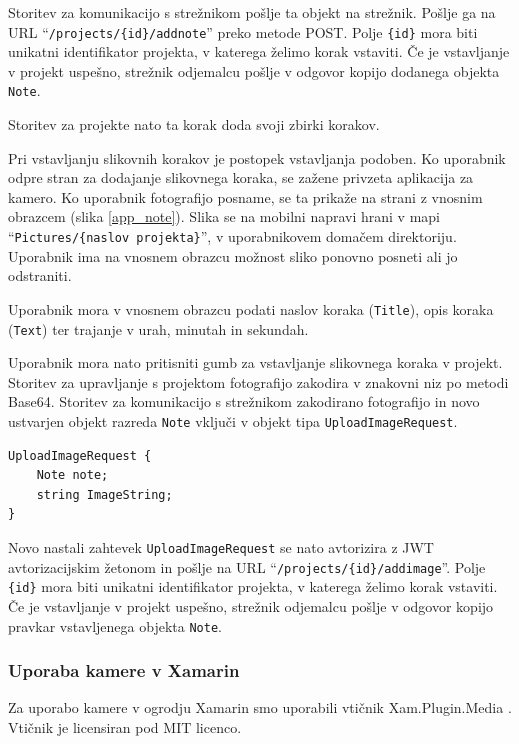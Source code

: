 \documentclass[a4paper, 12pt]{book}
\begin{document}
Storitev za komunikacijo s strežnikom pošlje ta objekt na strežnik.
Pošlje ga na URL \enquote{\texttt{/projects/\{id\}/addnote}} preko metode POST.
Polje \texttt{\{id\}} mora biti unikatni identifikator projekta, v katerega želimo korak vstaviti.
Če je vstavljanje v projekt uspešno, strežnik odjemalcu pošlje v odgovor kopijo dodanega objekta \texttt{Note}.

Storitev za projekte nato ta korak doda svoji zbirki korakov.

Pri vstavljanju slikovnih korakov je postopek vstavljanja podoben.
Ko uporabnik odpre stran za dodajanje slikovnega koraka, se zažene privzeta aplikacija za kamero.
Ko uporabnik fotografijo posname, se ta prikaže na strani z vnosnim obrazcem (slika \ref{app_note}).
Slika se na mobilni napravi hrani v mapi \enquote{\texttt{Pictures/\{naslov projekta\}}}, v uporabnikovem domačem direktoriju.
Uporabnik ima na vnosnem obrazcu možnost sliko ponovno posneti ali jo odstraniti.

Uporabnik mora v vnosnem obrazcu podati naslov koraka (\texttt{Title}), opis koraka (\texttt{Text}) ter trajanje v urah, minutah in sekundah.

Uporabnik mora nato pritisniti gumb za vstavljanje slikovnega koraka v projekt.
Storitev za upravljanje s projektom fotografijo zakodira v znakovni niz po metodi Base64.
Storitev za komunikacijo s strežnikom zakodirano fotografijo in novo ustvarjen objekt razreda \texttt{Note} vključi v objekt tipa \texttt{UploadImageRequest}.

\begin{Verbatim}[commandchars=+\[\]]
UploadImageRequest {
    Note note;
    string ImageString; 
}
\end{Verbatim}

Novo nastali zahtevek \texttt{UploadImageRequest} se nato avtorizira z JWT avtorizacijskim žetonom in pošlje na URL \enquote{\texttt{/projects/\{id\}/addimage}}.
Polje \texttt{\{id\}} mora biti unikatni identifikator projekta, v katerega želimo korak vstaviti.
Če je vstavljanje v projekt uspešno, strežnik odjemalcu pošlje v odgovor kopijo pravkar vstavljenega objekta \texttt{Note}.


\subsubsection{Uporaba kamere v Xamarin}


Za uporabo kamere v ogrodju Xamarin smo uporabili vtičnik Xam.Plugin.Media \cite{xampluginmedia}.
Vtičnik je licensiran pod MIT licenco.
\end{document}

